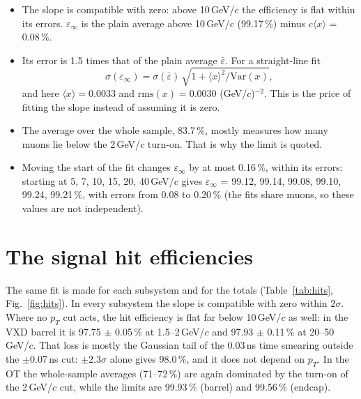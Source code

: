 \documentclass[11pt,letterpaper]{article}
\newcommand{\pT}{p_T}
\newcommand{\einf}{\varepsilon_\infty}
\begin{document}
\begin{itemize}[leftmargin=1.5em]
\item The slope is compatible with zero: above 10\,GeV/$c$ the efficiency is flat within its errors. $\einf$ is
the plain average above 10\,GeV/$c$ (99.17\,\%) minus $c\langle x\rangle$ = 0.08\,\%.
\item Its error is 1.5 times that of the plain average $\bar\varepsilon$. For a straight-line fit
\[
\sigma(\einf) = \sigma(\bar\varepsilon)\,\sqrt{1 + \langle x\rangle^2/\mathrm{Var}(x)} ,
\]
and here $\langle x\rangle = 0.0033$ and $\mathrm{rms}(x) = 0.0030$ (GeV/$c$)$^{-2}$. This is the price of
fitting the slope instead of assuming it is zero.
\item The average over the whole sample, 83.7\,\%, mostly measures how many muons lie below the
2\,GeV/$c$ turn-on. That is why the limit is quoted.
\item Moving the start of the fit changes $\einf$ by at most 0.16\,\%, within its errors:
starting at 5, 7, 10, 15, 20, 40\,GeV/$c$ gives $\einf$ = 99.12, 99.14, 99.08, 99.10, 99.24, 99.21\,\%, with errors from
0.08 to 0.20\,\% (the fits share muons, so these values are not independent).
\end{itemize}



\section{The signal hit efficiencies}

The same fit is made for each subsystem and for the totals (Table~\ref{tab:hits}, Fig.~\ref{fig:hits}). In every
subsystem the slope is compatible with zero within $2\sigma$. Where no $\pT$ cut acts, the hit efficiency is flat
far below 10\,GeV/$c$ as well: in the VXD barrel it is 97.75 $\pm$ 0.05\,\% at
1.5--2\,GeV/$c$ and 97.93 $\pm$ 0.11\,\% at 20--50\,GeV/$c$. That loss is mostly the
Gaussian tail of the 0.03\,ns time smearing outside the $\pm$0.07\,ns cut: $\pm2.3\sigma$ alone gives 98.0\,\%,
and it does not depend on $\pT$. In the OT the whole-sample averages (71--72\,\%) are
again dominated by the turn-on of the 2\,GeV/$c$ cut, while the limits are 99.93\,\% (barrel) and
99.56\,\% (endcap).
\end{document}
